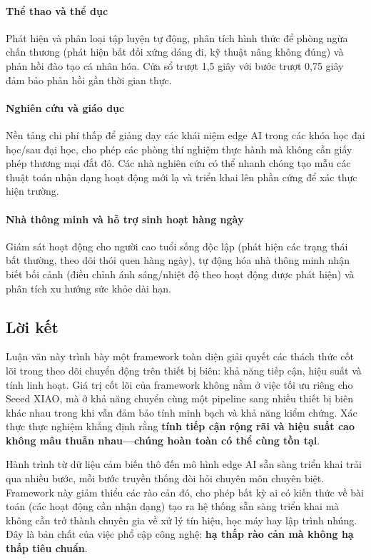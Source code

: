 \paragraph{Thể thao và thể dục}
Phát hiện và phân loại tập luyện tự động, phân tích hình thức để phòng ngừa chấn thương (phát hiện bất đối xứng dáng đi, kỹ thuật nâng không đúng) và phản hồi đào tạo cá nhân hóa. Cửa sổ trượt 1,5 giây với bước trượt 0,75 giây đảm bảo phản hồi gần thời gian thực.

\paragraph{Nghiên cứu và giáo dục}
Nền tảng chi phí thấp để giảng dạy các khái niệm edge AI trong các khóa học đại học/sau đại học, cho phép các phòng thí nghiệm thực hành mà không cần giấy phép thương mại đắt đỏ. Các nhà nghiên cứu có thể nhanh chóng tạo mẫu các thuật toán nhận dạng hoạt động mới lạ và triển khai lên phần cứng để xác thực hiện trường.

\paragraph{Nhà thông minh và hỗ trợ sinh hoạt hàng ngày}
Giám sát hoạt động cho người cao tuổi sống độc lập (phát hiện các trạng thái bất thường, theo dõi thói quen hàng ngày), tự động hóa nhà thông minh nhận biết bối cảnh (điều chỉnh ánh sáng/nhiệt độ theo hoạt động được phát hiện) và phân tích xu hướng sức khỏe dài hạn.

\subsection{Lời kết}
Luận văn này trình bày một framework toàn diện giải quyết các thách thức cốt lõi trong theo dõi chuyển động trên thiết bị biên: khả năng tiếp cận, hiệu suất và tính linh hoạt. Giá trị cốt lõi của framework không nằm ở việc tối ưu riêng cho Seeed XIAO, mà ở khả năng chuyển cùng một pipeline sang nhiều thiết bị biên khác nhau trong khi vẫn đảm bảo tính minh bạch và khả năng kiểm chứng. Xác thực thực nghiệm khẳng định rằng \textbf{tính tiếp cận rộng rãi và hiệu suất cao không mâu thuẫn nhau---chúng hoàn toàn có thể cùng tồn tại}.

Hành trình từ dữ liệu cảm biến thô đến mô hình edge AI sẵn sàng triển khai trải qua nhiều bước, mỗi bước truyền thống đòi hỏi chuyên môn chuyên biệt. Framework này giảm thiểu các rào cản đó, cho phép bất kỳ ai có kiến thức về bài toán (các hoạt động cần nhận dạng) tạo ra hệ thống sẵn sàng triển khai mà không cần trở thành chuyên gia về xử lý tín hiệu, học máy hay lập trình nhúng. Đây là bản chất của việc phổ cập công nghệ: \textbf{hạ thấp rào cản mà không hạ thấp tiêu chuẩn}.


